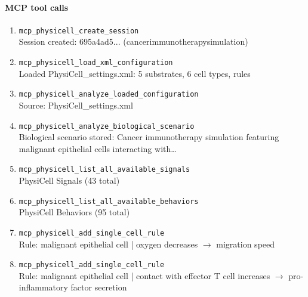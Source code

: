\paragraph{MCP tool calls}
\begingroup
\small
\setlength{\itemsep}{5pt}
\setlength{\parskip}{0pt}
\begin{enumerate}
\item[1.] \texttt{mcp\_\allowbreak{}physicell\_\allowbreak{}create\_\allowbreak{}session}
\hfill\\
\RaggedRight Session created: 695a4ad5... (cancerimmunotherapysimulation)
\item[2.] \texttt{mcp\_\allowbreak{}physicell\_\allowbreak{}load\_\allowbreak{}xml\_\allowbreak{}configuration}
\hfill\\
\RaggedRight Loaded PhysiCell\_settings.xml: 5 substrates, 6 cell types, rules
\item[3.] \texttt{mcp\_\allowbreak{}physicell\_\allowbreak{}analyze\_\allowbreak{}loaded\_\allowbreak{}configuration}
\hfill\\
\RaggedRight Source: PhysiCell\_settings.xml
\item[4.] \texttt{mcp\_\allowbreak{}physicell\_\allowbreak{}analyze\_\allowbreak{}biological\_\allowbreak{}scenario}
\hfill\\
\RaggedRight Biological scenario stored: Cancer immunotherapy simulation featuring malignant epithelial cells interacting with\ldots{}
\item[5.] \texttt{mcp\_\allowbreak{}physicell\_\allowbreak{}list\_\allowbreak{}all\_\allowbreak{}available\_\allowbreak{}signals}
\hfill\\
\RaggedRight PhysiCell Signals (43 total)
\item[6.] \texttt{mcp\_\allowbreak{}physicell\_\allowbreak{}list\_\allowbreak{}all\_\allowbreak{}available\_\allowbreak{}behaviors}
\hfill\\
\RaggedRight PhysiCell Behaviors (95 total)
\item[7.] \texttt{mcp\_\allowbreak{}physicell\_\allowbreak{}add\_\allowbreak{}single\_\allowbreak{}cell\_\allowbreak{}rule}
\hfill\\
\RaggedRight Rule: malignant epithelial cell | oxygen decreases \ensuremath{\rightarrow} migration speed
\item[8.] \texttt{mcp\_\allowbreak{}physicell\_\allowbreak{}add\_\allowbreak{}single\_\allowbreak{}cell\_\allowbreak{}rule}
\hfill\\
\RaggedRight Rule: malignant epithelial cell | contact with effector T cell increases \ensuremath{\rightarrow} pro-inflammatory factor secretion

\end{enumerate}
